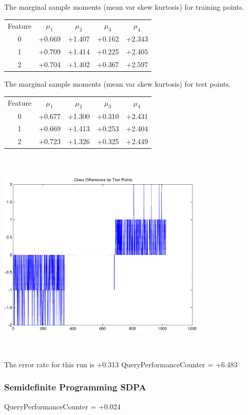 \documentclass[9pt]{article}
\theoremstyle{plain}
\theoremstyle{definition}
\theoremstyle{remark}
\numberwithin{equation}{section}
\begin{document}
The marginal sample moments (mean var skew kurtosis) for training points.\newline
\begin{tabular}{ c |  c  c  c  c}
Feature & $\mu_1$ & $\mu_2$ & $\mu_3$ & $\mu_4$ \\
0 & +0.669 & +1.407 & +0.162& +2.343 \\
\hline
1 & +0.709 & +1.414 & +0.225& +2.405 \\
\hline
2 & +0.704 & +1.402 & +0.367& +2.597 \\
\hline
\end{tabular}
\newline
The marginal sample moments (mean var skew kurtosis) for test points.\newline
\begin{tabular}{ c | c  c  c  c}
Feature & $\mu_1$ & $\mu_2$ & $\mu_3$ & $\mu_4$ \\
0 & +0.677 & +1.300 & +0.310& +2.431\\
\hline
1 & +0.669 & +1.413 & +0.253& +2.404\\
\hline
2 & +0.723 & +1.326 & +0.325& +2.449\\
\hline
\end{tabular}\newline
\includegraphics[width=10.0cm,height=10.0cm]{classDiffs.pdf}

The error rate for this run is +0.313\newline
QueryPerformanceCounter  =  +6.483
\subsubsection{Semidefinite Programming SDPA}
QueryPerformanceCounter  =  +0.024
\end{document}
